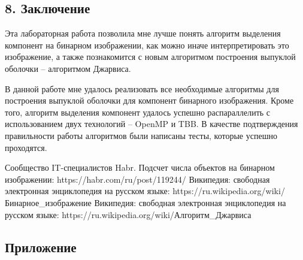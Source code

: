 \documentclass{report}
\begin{document}
\newpage


\begin{center}
\section*{8. Заключение}
\end{center}
\par Эта лабораторная работа позволила мне лучше понять алгоритм выделения компонент на бинарном изображении, как можно иначе интерпретировать это изображение, а также познакомится с новым алгоритмом построения выпуклой оболочки – алгоритмом Джарвиса.
\par В данной работе мне удалось реализовать все необходимые алгоритмы для построения выпуклой оболочки для компонент бинарного изображения. Кроме того, алгоритм выделения компонент удалось успешно распараллелить с использованием двух технологий – OpenMP и TBB. В качестве подтверждения правильности работы алгоритмов были написаны тесты, которые успешно проходятся.

\newpage


\begin{thebibliography}{9}
 Сообщество IT-специалистов Habr. Подсчет числа объектов на бинарном изображении: 
https://habr.com/ru/post/119244/
 Википедия: свободная электронная энциклопедия на русском языке:
https://ru.wikipedia.org/wiki/Бинарное\_изображение
 Википедия: свободная электронная энциклопедия на русском языке:
https://ru.wikipedia.org/wiki/Алгоритм\_Джарвиса 
\end{thebibliography}
\newpage


\begin{center}
\section*{Приложение}
\end{center}











\end{document}
